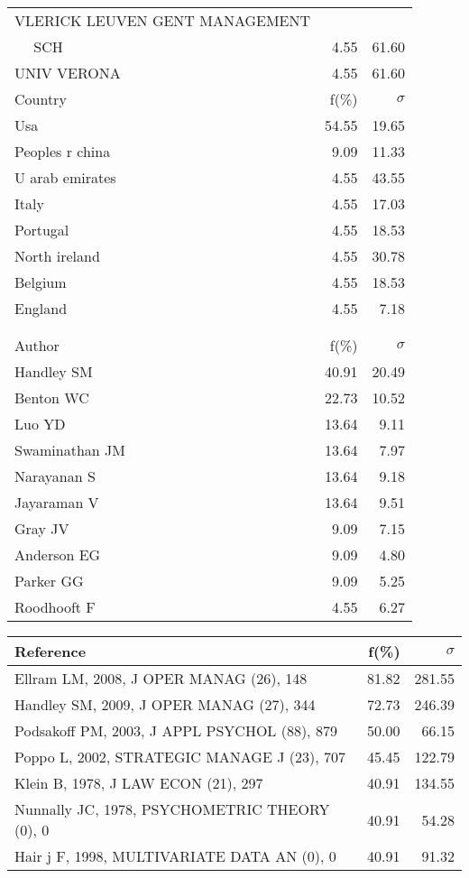 \documentclass[a4paper,11pt]{report}
\begin{document}
\begin{landscape}
\begin{table}[!ht]
{\begin{tabular}{|l r r|}
VLERICK LEUVEN GENT MANAGEMENT &  & \\
$\quad$ SCH & 4.55 & 61.60\\
UNIV VERONA & 4.55 & 61.60\\
\hline
\hline
Country & f(\%) & $\sigma$\\
\hline
Usa & 54.55 & 19.65\\
Peoples r china & 9.09 & 11.33\\
U arab emirates & 4.55 & 43.55\\
Italy & 4.55 & 17.03\\
Portugal & 4.55 & 18.53\\
North ireland & 4.55 & 30.78\\
Belgium & 4.55 & 18.53\\
England & 4.55 & 7.18\\
 &  & \\
 &  & \\
\hline
\hline
Author & f(\%) & $\sigma$\\
\hline
Handley SM & 40.91 & 20.49\\
Benton WC & 22.73 & 10.52\\
Luo YD & 13.64 & 9.11\\
Swaminathan JM & 13.64 & 7.97\\
Narayanan S & 13.64 & 9.18\\
Jayaraman V & 13.64 & 9.51\\
Gray JV & 9.09 & 7.15\\
Anderson EG & 9.09 & 4.80\\
Parker GG & 9.09 & 5.25\\
Roodhooft F & 4.55 & 6.27\\
\hline
\end{tabular}
}
{\scriptsize\begin{tabular}{|l r r|}
\hline
Reference & f(\%) & $\sigma$\\
\hline
Ellram LM, 2008, J OPER MANAG (26), 148 & 81.82 & 281.55\\
Handley SM, 2009, J OPER MANAG (27), 344 & 72.73 & 246.39\\
Podsakoff PM, 2003, J APPL PSYCHOL (88), 879 & 50.00 & 66.15\\
Poppo L, 2002, STRATEGIC MANAGE J (23), 707 & 45.45 & 122.79\\
Klein B, 1978, J LAW ECON (21), 297 & 40.91 & 134.55\\
Nunnally JC, 1978, PSYCHOMETRIC THEORY (0), 0 & 40.91 & 54.28\\
Hair j F, 1998, MULTIVARIATE DATA AN (0), 0 & 40.91 & 91.32\\

\end{tabular}}
\end{table}
\end{landscape}
\end{document}
